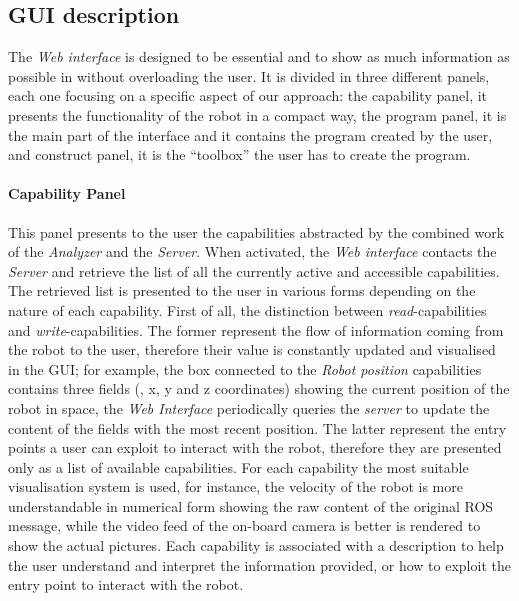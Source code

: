 \subsection{GUI description}
The \textit{Web interface} is designed to be essential and to show as much information as possible in without overloading the user. It is divided in three different panels, each one focusing on a specific aspect of our approach: the capability panel, it presents the functionality of the robot in a compact way, the program panel, it is the main part of the interface and it contains the program created by the user, and construct panel, it is the ``toolbox'' the user has to create the program.

\paragraph{Capability Panel} This panel presents to the user the capabilities abstracted by the combined work of the \textit{Analyzer} and the \textit{Server}. When activated, the \textit{Web interface} contacts the \textit{Server} and retrieve the list of all the currently active and accessible capabilities. The retrieved list is presented to the user in various forms depending on the nature of each capability. First of all, the distinction between \textit{read}-capabilities and \textit{write}-capabilities. The former represent the flow of information coming from the robot to the user, therefore their value is constantly updated and visualised in the GUI; for example, the box connected to the \textit{Robot position} capabilities contains three fields (\ie, x, y and z coordinates) showing the current position of the robot in space, the \textit{Web Interface} periodically queries the \textit{server} to update the content of the fields with the most recent position. The latter represent the entry points a user can exploit to interact with the robot, therefore they are presented only as a list of available capabilities. For each capability the most suitable visualisation system is used, for instance, the velocity of the robot is more understandable in numerical form showing the raw content of the original ROS message, while the video feed of the on-board camera is better is rendered to show the actual pictures. Each capability is associated with a description to help the user understand and interpret the information provided, or how to exploit the entry point to interact with the robot.

